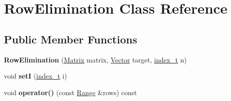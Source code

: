 \hypertarget{class_row_elimination}{
\section{RowElimination Class Reference}
\label{class_row_elimination}
}
\subsection*{Public Member Functions}
\begin{CompactItemize}
\item 
\hypertarget{class_row_elimination_582416939554bbb8e462e53d6d86f8d6}{
\textbf{RowElimination} (\hyperlink{cowichan_8hpp_3fb46f939e55c239fbc95656fc0f3399}{Matrix} matrix, \hyperlink{cowichan_8hpp_02bc1553e241b9b33408482658b3c355}{Vector} target, \hyperlink{cowichan_8hpp_5b04577d5d21124855deaad298595371}{index\_\-t} n)}
\label{class_row_elimination_582416939554bbb8e462e53d6d86f8d6}

\item 
\hypertarget{class_row_elimination_9037d2255c9363e4ed5315e4457e09c2}{
void \textbf{setI} (\hyperlink{cowichan_8hpp_5b04577d5d21124855deaad298595371}{index\_\-t} i)}
\label{class_row_elimination_9037d2255c9363e4ed5315e4457e09c2}

\item 
\hypertarget{class_row_elimination_8fa4ceac659d237e6cf693321623e328}{
void \textbf{operator()} (const \hyperlink{cowichan__tbb_8hpp_8e2057f725b08f3a15513c378a453a47}{Range} \&rows) const }
\label{class_row_elimination_8fa4ceac659d237e6cf693321623e328}

\end{CompactItemize}
